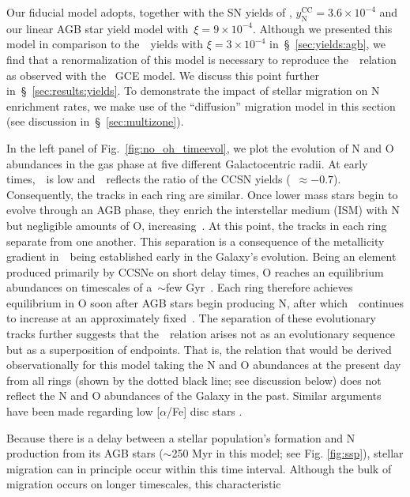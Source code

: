 \documentclass[ms.tex]{subfiles}
\begin{document}
Our fiducial model adopts, together with the SN yields of
\citet[][see discussion in~\S~\ref{sec:yields:ccsne}]{Johnson2021},
$y_\text{N}^\text{CC} = 3.6\times10^{-4}$ and our linear AGB star yield model
with~$\xi = 9\times10^{-4}$.
Although we presented this model in comparison to the~\cristallo~yields with
$\xi = 3\times10^{-4}$ in~\S~\ref{sec:yields:agb}, we find that a
renormalization of this model is necessary to reproduce the~\ohno~relation as
observed with the~\citet{Johnson2021} GCE model.
We discuss this point further in~\S~\ref{sec:results:yields}.
To demonstrate the impact of stellar migration on N enrichment rates, we make
use of the ``diffusion'' migration model in this section (see discussion
in~\S~\ref{sec:multizone}).
\par
In the left panel of Fig.~\ref{fig:no_oh_timeevol}, we plot the evolution of N
and O abundances in the gas phase at five different Galactocentric radii.
At early times,~\oh~is low and~\no~reflects the ratio of the CCSN yields
(\no\subcc~$\approx -0.7$).
Consequently, the tracks in each ring are similar.
Once lower mass stars begin to evolve through an AGB phase, they enrich the
interstellar medium (ISM) with N but negligible amounts of O, increasing~\no.
At this point, the tracks in each ring separate from one another.
This separation is a consequence of the metallicity gradient in~\oh~being
established early in the Galaxy's evolution.
Being an element produced primarily by CCSNe on short delay times, O reaches
an equilibrium abundances on timescales of a~$\sim$few Gyr~\citep{Weinberg2017}.
Each ring therefore achieves equilibrium in O soon after AGB stars begin
producing N, after which~\no~continues to increase at an approximately
fixed~\oh.
The separation of these evolutionary tracks further suggests that
the~\ohno~relation arises not as an evolutionary sequence but as a
superposition of endpoints.
That is, the relation that would be derived observationally for this model
taking the N and O abundances at the present day from all rings (shown by the
dotted black line; see discussion below) does not reflect the N and O
abundances of the Galaxy in the past.
Similar arguments have been made regarding low [$\alpha$/Fe] disc stars
\citep[e.g.][]{Schoenrich2009, Sharma2021}.
\par
Because there is a delay between a stellar population's formation and N
production from its AGB stars ($\sim$250 Myr in this model; see Fig.
\ref{fig:ssp}), stellar migration can in principle occur within this time
interval.
Although the bulk of migration occurs on longer timescales, this characteristic
\end{document}
